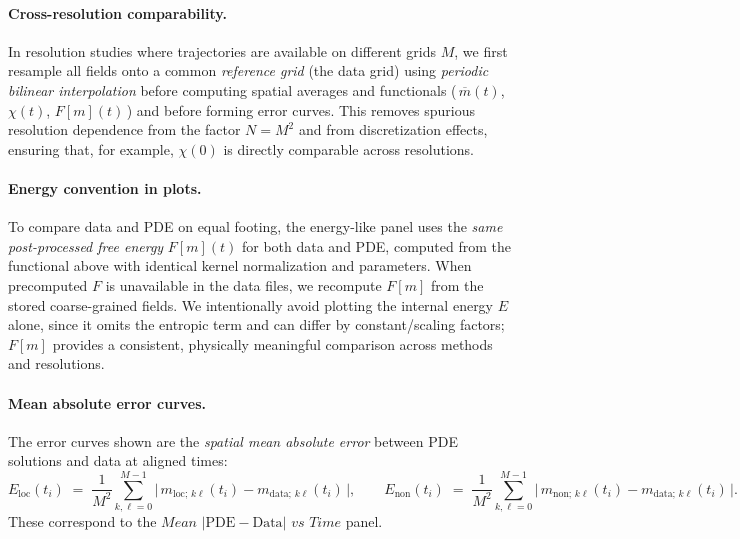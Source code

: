 \documentclass[11pt,a4paper]{article}
\begin{document}
\paragraph{Cross-resolution comparability.} In resolution studies where trajectories are available on different grids $M$, we first resample all fields onto a common \emph{reference grid} (the data grid) using \emph{periodic bilinear interpolation} before computing spatial averages and functionals (\,$\overline m(t)$, $\chi(t)$, $F[m](t)$\,) and before forming error curves. This removes spurious resolution dependence from the factor $N=M^2$ and from discretization effects, ensuring that, for example, $\chi(0)$ is directly comparable across resolutions.

\paragraph{Energy convention in plots.} To compare data and PDE on equal footing, the energy-like panel uses the \emph{same post-processed free energy} $F[m](t)$ for both data and PDE, computed from the functional above with identical kernel normalization and parameters. When precomputed $F$ is unavailable in the data files, we recompute $F[m]$ from the stored coarse-grained fields. We intentionally avoid plotting the internal energy $E$ alone, since it omits the entropic term and can differ by constant/scaling factors; $F[m]$ provides a consistent, physically meaningful comparison across methods and resolutions.

\paragraph{Mean absolute error curves.} The error curves shown are the \emph{spatial mean absolute error} between PDE solutions and data at aligned times:
\begin{equation}
    E_{\text{loc}}(t_i) \;=\; \frac{1}{M^2} \sum_{k,\ell=0}^{M-1} \big|\, m_{\text{loc};\,k\ell}(t_i) - m_{\text{data};\,k\ell}(t_i) \,\big|,
    \qquad
    E_{\text{non}}(t_i) \;=\; \frac{1}{M^2} \sum_{k,\ell=0}^{M-1} \big|\, m_{\text{non};\,k\ell}(t_i) - m_{\text{data};\,k\ell}(t_i) \,\big|.
\end{equation}
These correspond to the $\textit{Mean $|\mathrm{PDE}-\mathrm{Data}|$ vs Time}$ panel.
\end{document}
